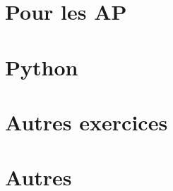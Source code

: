 \documentclass[a4paper,12pt]{book}
\begin{document}
\part{Pour les AP}


\part{Python}



\part{Autres exercices}




\part{Autres}







   


\printindex
\end{document}
